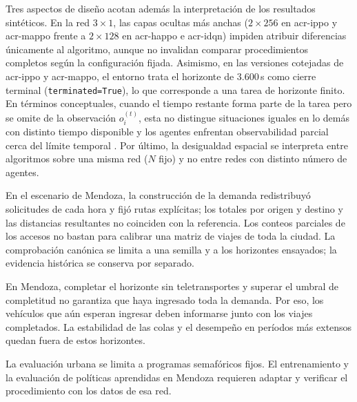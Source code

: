 Tres aspectos de diseño acotan además la interpretación de los resultados sintéticos. En la red $3\times1$, las capas ocultas más anchas ($2\times256$ en \acrshort{acr-ippo} y \acrshort{acr-mappo} frente a $2\times128$ en \acrshort{acr-happo} e \acrshort{acr-idqn}) impiden atribuir diferencias únicamente al algoritmo, aunque no invalidan comparar procedimientos completos según la configuración fijada. Asimismo, en las versiones cotejadas de \acrshort{acr-ippo} y \acrshort{acr-mappo}, el entorno trata el horizonte de 3.600\,s como cierre terminal (\texttt{terminated=True}), lo que corresponde a una tarea de horizonte finito. En términos conceptuales, cuando el tiempo restante forma parte de la tarea pero se omite de la observación $o_i^{(t)}$, esta no distingue situaciones iguales en lo demás con distinto tiempo disponible y los agentes enfrentan observabilidad parcial cerca del límite temporal \cite{pardo2018timelimits}. Por último, la desigualdad espacial se interpreta entre algoritmos sobre una misma red ($N$ fijo) y no entre redes con distinto número de agentes.

\begingroup
{}
En el escenario de Mendoza, la construcción de la demanda redistribuyó solicitudes de cada hora y fijó rutas explícitas; los totales por origen y destino y las distancias resultantes no coinciden con la referencia. Los conteos parciales de los accesos no bastan para calibrar una matriz de viajes de toda la ciudad. La comprobación canónica se limita a una semilla y a los horizontes ensayados; la evidencia histórica se conserva por separado.
\par
\endgroup

En Mendoza, completar el horizonte sin teletransportes y superar el umbral de completitud no garantiza que haya ingresado toda la demanda. Por eso, los vehículos que aún esperan ingresar deben informarse junto con los viajes completados. La estabilidad de las colas y el desempeño en períodos más extensos quedan fuera de estos horizontes.

La evaluación urbana se limita a programas semafóricos fijos. El entrenamiento y la evaluación de políticas aprendidas en Mendoza requieren adaptar y verificar el procedimiento con los datos de esa red.
